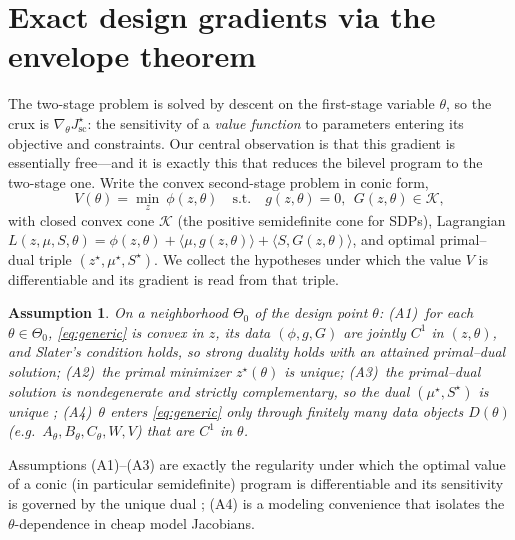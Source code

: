 \documentclass[twocolumn,amsthm]{autart}
\newtheorem{assumption}{Assumption}
\begin{document}
\section{Exact design gradients via the envelope theorem}\label{sec:envelope}

The two-stage problem is solved by descent on the first-stage variable $\theta$,
so the crux is $\nabla_\theta J_{\mathrm{sc}}^\star$: the sensitivity of a
\emph{value function} to parameters entering its objective and constraints. Our
central observation is that this gradient is essentially free---and it is exactly
this that reduces the bilevel program to the two-stage one. Write the convex
second-stage problem in conic form,
\begin{equation}\label{eq:generic}
V(\theta) = \min_{z}\ \phi(z,\theta)\quad \text{s.t.}\quad g(z,\theta)=0,\ \
G(z,\theta) \in \mathcal{K},
\end{equation}
with closed convex cone $\mathcal{K}$ (the positive semidefinite cone for SDPs),
Lagrangian $L(z,\mu,S,\theta) = \phi(z,\theta) + \langle \mu, g(z,\theta)\rangle
+ \langle S, G(z,\theta)\rangle$, and optimal primal--dual triple
$(z^\star,\mu^\star,S^\star)$. We collect the hypotheses under which the value
$V$ is differentiable and its gradient is read from that triple.

\begin{assumption}\label{as:env}
On a neighborhood $\Theta_0$ of the design point $\theta$:
\emph{(A1)}~for each $\theta\in\Theta_0$, \eqref{eq:generic} is convex in $z$,
its data $(\phi,g,G)$ are jointly $C^1$ in $(z,\theta)$, and Slater's condition
holds, so strong duality holds with an attained primal--dual solution;
\emph{(A2)}~the primal minimizer $z^\star(\theta)$ is unique;
\emph{(A3)}~the primal--dual solution is \emph{nondegenerate} and strictly
complementary, so the dual $(\mu^\star,S^\star)$ is unique
\cite{alizadeh1997complementarity,shapiro1997differentiability};
\emph{(A4)}~$\theta$ enters \eqref{eq:generic} only through finitely many data
objects $D(\theta)$ (e.g.\ $A_\theta,B_\theta,C_\theta,W,V$) that are $C^1$
in $\theta$.
\end{assumption}

Assumptions (A1)--(A3) are exactly the regularity under which the optimal value
of a conic (in particular semidefinite) program is differentiable and its
sensitivity is governed by the unique dual
\cite{bonnans2000perturbation,shapiro1997differentiability}; (A4) is a modeling
convenience that isolates the $\theta$-dependence in cheap model Jacobians.
\end{document}
